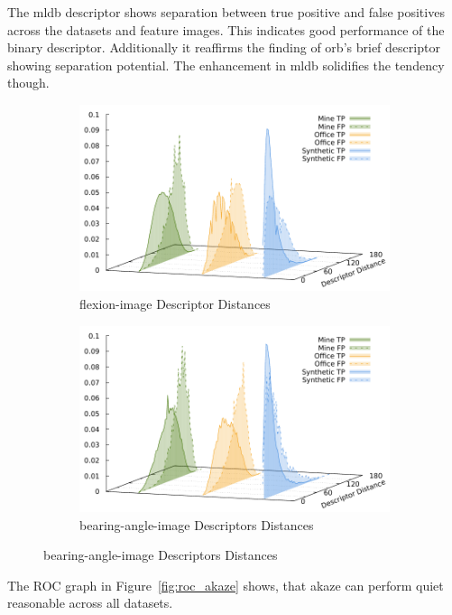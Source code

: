 The \acrshort{mldb} descriptor shows separation between true positive and false positives across the datasets and feature images.
This indicates good performance of the binary descriptor.
Additionally it reaffirms the finding of \acrshort{orb}'s \acrshort{brief} descriptor showing separation potential.
The enhancement in \acrshort{mldb} solidifies the tendency though.
\begin{figure}[htp]
\begin{subfigure}[t]{0.45\linewidth}
    \includegraphics[width=\linewidth]{chapter06/results/AKAZE/flexion/descriptor_distances.pdf}%
    \caption{\gls{flexion-image} Descriptor Distances}
\end{subfigure}\quad
\begin{subfigure}[t]{0.45\linewidth}
    \includegraphics[width=\linewidth]{chapter06/results/AKAZE/bearing/descriptor_distances.pdf}%
    \caption{\gls{bearing-angle-image} Descriptors Distances}
\end{subfigure}
\end{figure}
The ROC graph in Figure~\ref{fig:roc_akaze} shows, that \acrshort{akaze} can perform quiet reasonable across all datasets.
